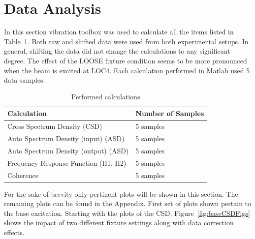\documentclass[paper=a4, fontsize=12pt]{scrartcl} %
\begin{document}
\section*{Data Analysis}
In this section vibration toolbox was used to calculate all the items listed in Table~\ref{table:performedCalculations}. Both raw and shifted data were used from both experimental setups. In general, shifting the data did not change the calculations to any significant degree. The effect of the LOOSE fixture condition seems to be more pronounced when the beam is excited at LOC4. Each calculation performed in Matlab used 5 data samples.
%
\begin{table}[H]
\centering
\begin{tabular}{ l | l }
		\textbf{Calculation} & \textbf{Number of Samples} \\
	\hline                       
		Cross Spectrum Density (CSD) & 5 samples \\
	\hline
		Auto Spectrum Density (input) (ASD) & 5 samples \\
	\hline
		Auto Spectrum Density (output) (ASD) & 5 samples \\
	\hline  
		Frequency Response Function (H1, H2) & 5 samples \\
	\hline  
		Coherence & 5 samples \\
\end{tabular}
\caption{Performed calculations}
\label{table:performedCalculations}
\end{table}
%
For the sake of brevity only pertinent plots will be shown in this section. The remaining plots can be found in the Appendix. First set of plots shown pertain to the base excitation. Starting with the plots of the CSD, Figure~\ref{fig:baseCSDFigs} shows the impact of two different fixture settings along with data correction effects.
%
\end{document}
